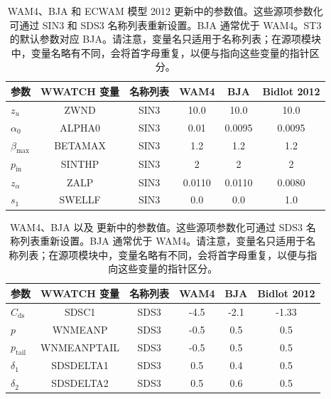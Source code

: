 \begin{table}[htb]
\begin{center}
\begin{tabular}{|l|c|c|c|c|c|} \hline \hline
参数         &  WWATCH 变量           & 名称列表 & WAM4 & BJA   & Bidlot 2012 \\
\hline
  $z_u$ &  ZWND                       & SIN3 & 10.0    & 10.0   & 10.0   \\
  $\alpha_0$ &  ALPHA0                & SIN3 & 0.01    & 0.0095 &  0.0095 \\
  $\beta_{\mathrm{max}}$ & BETAMAX    & SIN3 & 1.2     & 1.2    & 1.2  \\
  $p_{\mathrm{in}}$ &  SINTHP         & SIN3 & 2       & 2      & 2  \\
  $z_\alpha$ &  ZALP                  & SIN3 & 0.0110  & 0.0110 &  0.0080 \\
  $s_1$ &  SWELLF                     & SIN3 & 0.0     & 0.0    & 1.0   \\
\hline
\end{tabular} \end{center}
\caption{WAM4、BJA 和 ECWAM 模型 2012 更新中的参数值。这些源项参数化可通过 {\F SIN3} 和 {\F SDS3} 名称列表重新设置。BJA 通常优于 WAM4。ST3 的默认参数对应 BJA。请注意，变量名只适用于名称列表；在源项模块中，变量名略有不同，会将首字母重复，以便与指向这些变量的指针区分。} \label{tab:WAM4_parSIN}
\botline
\end{table}

\begin{table}[htb] 
\begin{center}
\begin{tabular}{|l|c|c|c|c|c|} \hline \hline
参数                               &  WWATCH 变量         & 名称列表 & WAM4 & BJA   & Bidlot 2012 \\
\hline
  $C_{\mathrm{ds}}$                 &  SDSC1          & SDS3 & -4.5 & -2.1& -1.33       \\
  $p$                               &  WNMEANP        & SDS3 & -0.5 & 0.5 &  0.5        \\
  $p_{\mathrm{tail}}$               &  WNMEANPTAIL    & SDS3 & -0.5 & 0.5 &  0.5        \\
  $\delta_1$                        &  SDSDELTA1      & SDS3 & 0.5  & 0.4 &  0.5        \\
  $\delta_2$                        &  SDSDELTA2      & SDS3 & 0.5  & 0.6 &  0.5 \\
  \hline \hline
\end{tabular} \end{center}
\caption{WAM4、BJA 以及 \cite{pro:Bid12} 更新中的参数值。这些源项参数化可通过 {\F SDS3} 名称列表重新设置。BJA 通常优于 WAM4。请注意，变量名只适用于名称列表；在源项模块中，变量名略有不同，会将首字母重复，以便与指向这些变量的指针区分。} \label{tab:WAM4_parSDS}
\botline
\end{table}



